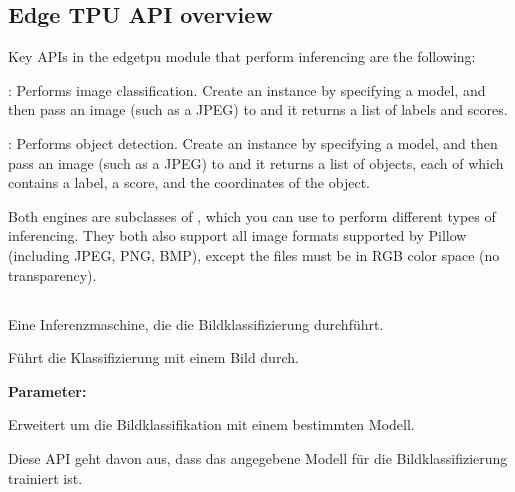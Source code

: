 

\subsection{Edge TPU API overview}
Key APIs in the edgetpu module that perform inferencing are the following:

: Performs image classification. Create an instance by specifying a model, and then pass an image (such as a JPEG) to  and it returns a list of labels and scores.

: Performs object detection. Create an instance by specifying a model, and then pass an image (such as a JPEG) to  and it returns a list of  objects, each of which contains a label, a score, and the coordinates of the object.

Both engines are subclasses of , which you can use to perform different types of inferencing. They both also support all image formats supported by Pillow (including JPEG, PNG, BMP), except the files must be in RGB color space (no transparency).

\subsection{}

Eine Inferenzmaschine, die die Bildklassifizierung durchführt.

\medskip


\medskip


Führt die Klassifizierung mit einem Bild durch.

\medskip


\textbf{Parameter:}

Erweitert  um die Bildklassifikation mit einem bestimmten Modell.

Diese API geht davon aus, dass das angegebene Modell für die Bildklassifizierung trainiert ist.

